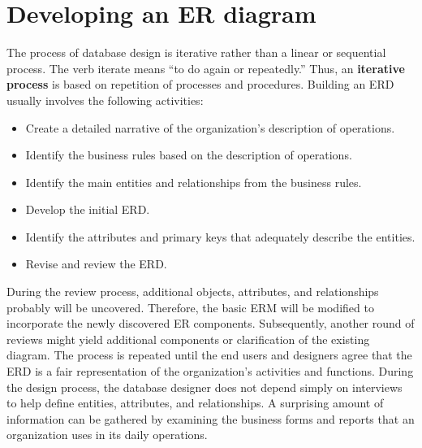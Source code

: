 \documentclass[a4paper, 12pt, titlepage]{report}
\begin{document}
{\section{Developing an ER diagram}
The process of database design is iterative rather than a linear or sequential process. The verb iterate means “to do again or repeatedly.” Thus, an \textbf{iterative process} is based on repetition of processes and procedures. Building an ERD usually involves the following activities:
\begin{itemize}
\item Create a detailed narrative of the organization’s description of operations.
\item Identify the business rules based on the description of operations.
\item Identify the main entities and relationships from the business rules.
\item Develop the initial ERD.
\item Identify the attributes and primary keys that adequately describe the entities.
\item Revise and review the ERD.
\end{itemize}
During the review process, additional objects, attributes, and relationships probably will be uncovered. Therefore, the basic ERM will be modified to incorporate the newly
discovered ER components. Subsequently, another round of reviews might yield additional components or clarification of the existing diagram. The process is repeated until
the end users and designers agree that the ERD is a fair representation of the organization’s activities and functions. During the design process, the database designer does not depend simply on interviews to help define entities, attributes, and relationships. A surprising amount of information can be gathered by examining the business forms and reports that an organization uses in its daily operations.
\begin{figure}[H]
\centering

\end{figure}}
\end{document}

